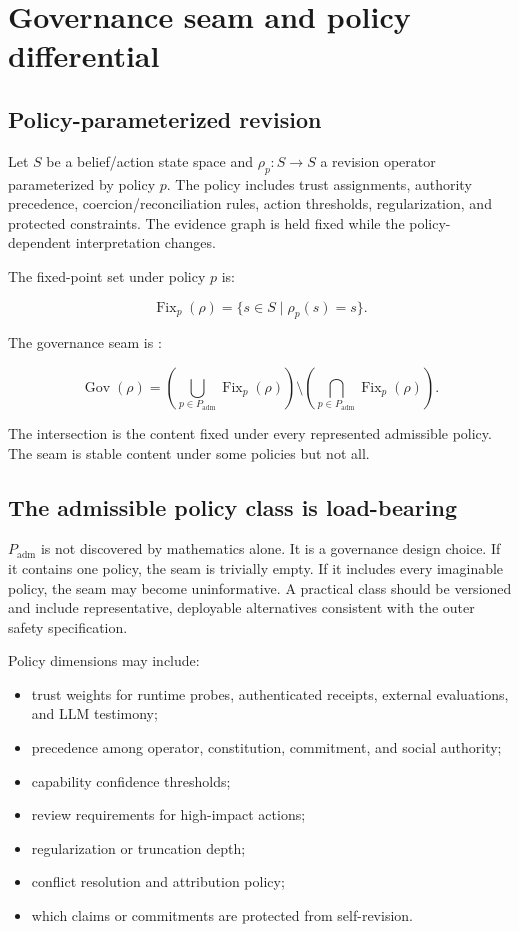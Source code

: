\documentclass[11pt,oneside]{report}
\newcommand{\Padm}{P_{\mathrm{adm}}}
\newcommand{\Gov}{\operatorname{Gov}}
\newcommand{\Fix}{\operatorname{Fix}}
\begin{document}
\chapter{Governance seam and policy differential}

\section{Policy-parameterized revision}

Let $S$ be a belief/action state space and $\rho_p:S\rightarrow S$ a revision operator parameterized by policy $p$. The policy includes trust assignments, authority precedence, coercion/reconciliation rules, action thresholds, regularization, and protected constraints. The evidence graph is held fixed while the policy-dependent interpretation changes.

The fixed-point set under policy $p$ is:

\[
\Fix_p(\rho)=\{s\in S\mid\rho_p(s)=s\}.
\]

The governance seam is \cite{gov-seam}:

\[
\Gov(\rho)=
\left(\bigcup_{p\in\Padm}\Fix_p(\rho)\right)
\setminus
\left(\bigcap_{p\in\Padm}\Fix_p(\rho)\right).
\]

The intersection is the content fixed under every represented admissible policy. The seam is stable content under some policies but not all.

\section{The admissible policy class is load-bearing}

$\Padm$ is not discovered by mathematics alone. It is a governance design choice. If it contains one policy, the seam is trivially empty. If it includes every imaginable policy, the seam may become uninformative. A practical class should be versioned and include representative, deployable alternatives consistent with the outer safety specification.

Policy dimensions may include:

\begin{itemize}
  \item trust weights for runtime probes, authenticated receipts, external evaluations, and LLM testimony;
  \item precedence among operator, constitution, commitment, and social authority;
  \item capability confidence thresholds;
  \item review requirements for high-impact actions;
  \item regularization or truncation depth;
  \item conflict resolution and attribution policy;
  \item which claims or commitments are protected from self-revision.
\end{itemize}
\end{document}
